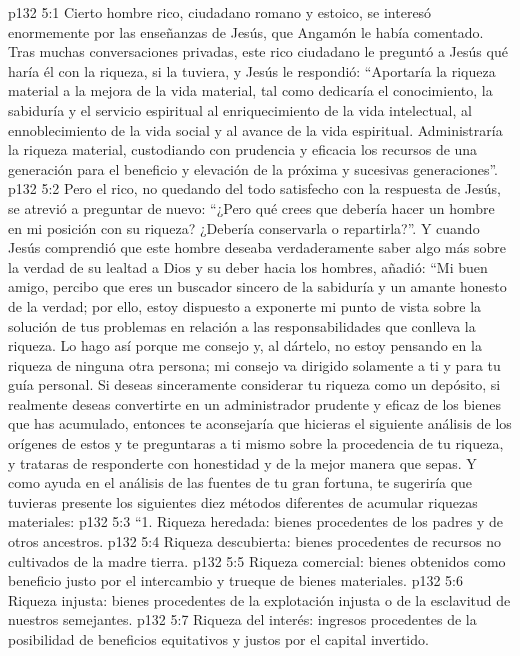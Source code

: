 \vs p132 5:1 Cierto hombre rico, ciudadano romano y estoico, se interesó enormemente por las enseñanzas de Jesús, que Angamón le había comentado. Tras muchas conversaciones privadas, este rico ciudadano le preguntó a Jesús qué haría él con la riqueza, si la tuviera, y Jesús le respondió: “Aportaría la riqueza material a la mejora de la vida material, tal como dedicaría el conocimiento, la sabiduría y el servicio espiritual al enriquecimiento de la vida intelectual, al ennoblecimiento de la vida social y al avance de la vida espiritual. Administraría la riqueza material, custodiando con prudencia y eficacia los recursos de una generación para el beneficio y elevación de la próxima y sucesivas generaciones”.
\vs p132 5:2 Pero el rico, no quedando del todo satisfecho con la respuesta de Jesús, se atrevió a preguntar de nuevo: “¿Pero qué crees que debería hacer un hombre en mi posición con su riqueza? ¿Debería conservarla o repartirla?”. Y cuando Jesús comprendió que este hombre deseaba verdaderamente saber algo más sobre la verdad de su lealtad a Dios y su deber hacia los hombres, añadió: “Mi buen amigo, percibo que eres un buscador sincero de la sabiduría y un amante honesto de la verdad; por ello, estoy dispuesto a exponerte mi punto de vista sobre la solución de tus problemas en relación a las responsabilidades que conlleva la riqueza. Lo hago así porque me  consejo y, al dártelo, no estoy pensando en la riqueza de ninguna otra persona; mi consejo va dirigido solamente a ti y para tu guía personal. Si deseas sinceramente considerar tu riqueza como un depósito, si realmente deseas convertirte en un administrador prudente y eficaz de los bienes que has acumulado, entonces te aconsejaría que hicieras el siguiente análisis de los orígenes de estos y te preguntaras a ti mismo sobre la procedencia de tu riqueza, y trataras de responderte con honestidad y de la mejor manera que sepas. Y como ayuda en el análisis de las fuentes de tu gran fortuna, te sugeriría que tuvieras presente los siguientes diez métodos diferentes de acumular riquezas materiales:
\vs p132 5:3 “1. Riqueza heredada: bienes procedentes de los padres y de otros ancestros.
\vs p132 5:4 Riqueza descubierta: bienes procedentes de recursos no cultivados de la madre tierra.
\vs p132 5:5 Riqueza comercial: bienes obtenidos como beneficio justo por el intercambio y trueque de bienes materiales.
\vs p132 5:6 Riqueza injusta: bienes procedentes de la explotación injusta o de la esclavitud de nuestros semejantes.
\vs p132 5:7 Riqueza del interés: ingresos procedentes de la posibilidad de beneficios equitativos y justos por el capital invertido.
